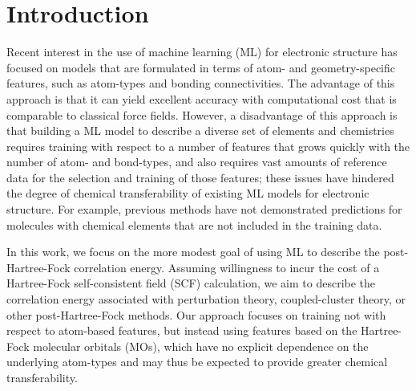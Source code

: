 \documentclass[%
 aps,
 prb,
 twocolumn,
%
 reprint,%
%
citeautoscript,
%
showkeys
]{revtex4-1}
\begin{document}
\section{Introduction}
Recent interest in the use of machine learning (ML)  for electronic structure has  focused on models that are formulated in terms of atom- and geometry-specific features, such as atom-types and bonding connectivities.
%
%
The advantage of this approach is that it can yield excellent accuracy with computational cost that is comparable to classical force fields.\cite{Bartok2010,rupp2012fast,VonLilienfeld2013,hansen2013assessment, Ceriotti2014,ramakrishnan2015big,Tuckerman,Behler2016,kearnes2016molecular,Paesani2016, schutt2017quantum,Smith2017,wu2018moleculenet,Nguyen2018,Yao2018, Fujikake2018}  %
However, a %
disadvantage of this approach is that building a ML model to describe a diverse %
set of elements and  chemistries requires training with respect to a number of features that grows quickly with the number of atom- and bond-types, %
%
and also requires vast amounts of reference data for %
the selection and training of those features; these issues have hindered the degree of 
chemical transferability of existing ML models for electronic structure.
For example, previous methods have not demonstrated predictions for molecules with chemical elements that are not included in the training data.

%

%

In this work, we focus on the more modest goal of using ML to describe the post-Hartree-Fock correlation energy.  Assuming willingness to incur the cost of a Hartree-Fock self-consistent field (SCF) calculation, we aim to describe the correlation energy associated with perturbation theory,\cite{Moller1934} coupled-cluster theory,\cite{Cizek1966} or other post-Hartree-Fock methods.
Our approach focuses on training not %
with respect to atom-based features, but instead using features based on the Hartree-Fock molecular orbitals (MOs), which have no explicit dependence on %
 the underlying atom-types %
and  may thus be expected to provide greater chemical transferability.
%
\end{document}
